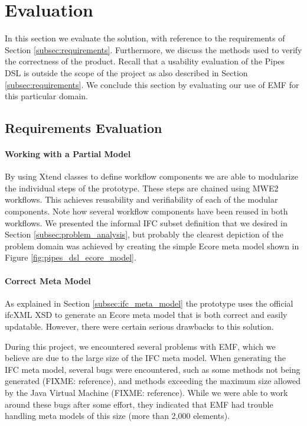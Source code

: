 \section{Evaluation}
\label{sec:evaluation}
In this section we evaluate the solution, with reference to the requirements of Section \ref{subsec:requirements}. Furthermore, we discuss the methods used to verify the correctness of the product. Recall that a usability evaluation of the Pipes DSL is outside the scope of the project as also described in Section \ref{subsec:requirements}. We conclude this section by evaluating our use of EMF for this particular domain.


\subsection{Requirements Evaluation}
\label{subsec:requirements_evaluation}
\paragraph{Working with a Partial Model} By using Xtend classes to define workflow components we are able to modularize the individual steps of the prototype. These steps are chained using MWE2 workflows. This achieves reusability and verifiability of each of the modular components. Note how several workflow components have been reused in both workflows. We presented the informal IFC subset definition that we desired in Section \ref{subsec:problem_analysis}, but probably the clearest depiction of the problem domain was achieved by creating the simple Ecore meta model shown in Figure \ref{fig:pipes_dsl_ecore_model}.

\paragraph{Correct Meta Model} As explained in Section \ref{subsec:ifc_meta_model} the prototype uses the official ifcXML XSD to generate an Ecore meta model that is both correct and easily updatable. However, there were certain serious drawbacks to this solution.

During this project, we encountered several problems with EMF, which we believe are due to the large size of the IFC meta model. When generating the IFC meta model, several bugs were encountered, such as some methods not being generated (FIXME: reference), and methods exceeding the maximum size allowed by the Java Virtual Machine (FIXME: reference). While we were able to work around these bugs after some effort, they indicated that EMF had trouble handling meta models of this size (more than 2,000 elements).

